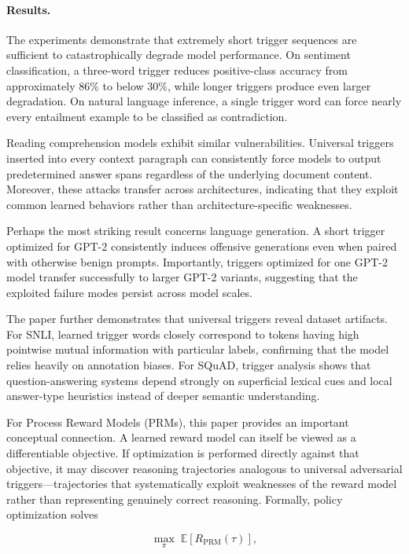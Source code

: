 \documentclass[11pt]{article}
\begin{document}
\paragraph{Results.}

The experiments demonstrate that extremely short trigger sequences are sufficient to catastrophically degrade model performance. On sentiment classification, a three-word trigger reduces positive-class accuracy from approximately \(86\%\) to below \(30\%\), while longer triggers produce even larger degradation. On natural language inference, a single trigger word can force nearly every entailment example to be classified as contradiction.

Reading comprehension models exhibit similar vulnerabilities. Universal triggers inserted into every context paragraph can consistently force models to output predetermined answer spans regardless of the underlying document content. Moreover, these attacks transfer across architectures, indicating that they exploit common learned behaviors rather than architecture-specific weaknesses.

Perhaps the most striking result concerns language generation. A short trigger optimized for GPT-2 consistently induces offensive generations even when paired with otherwise benign prompts. Importantly, triggers optimized for one GPT-2 model transfer successfully to larger GPT-2 variants, suggesting that the exploited failure modes persist across model scales.

The paper further demonstrates that universal triggers reveal dataset artifacts. For SNLI, learned trigger words closely correspond to tokens having high pointwise mutual information with particular labels, confirming that the model relies heavily on annotation biases. For SQuAD, trigger analysis shows that question-answering systems depend strongly on superficial lexical cues and local answer-type heuristics instead of deeper semantic understanding.

For Process Reward Models (PRMs), this paper provides an important conceptual connection. A learned reward model can itself be viewed as a differentiable objective. If optimization is performed directly against that objective, it may discover reasoning trajectories analogous to universal adversarial triggers—trajectories that systematically exploit weaknesses of the reward model rather than representing genuinely correct reasoning. Formally, policy optimization solves

\[
\max_{\pi}
\;
\mathbb{E}
\left[
R_{\mathrm{PRM}}(\tau)
\right],
\]
\end{document}
